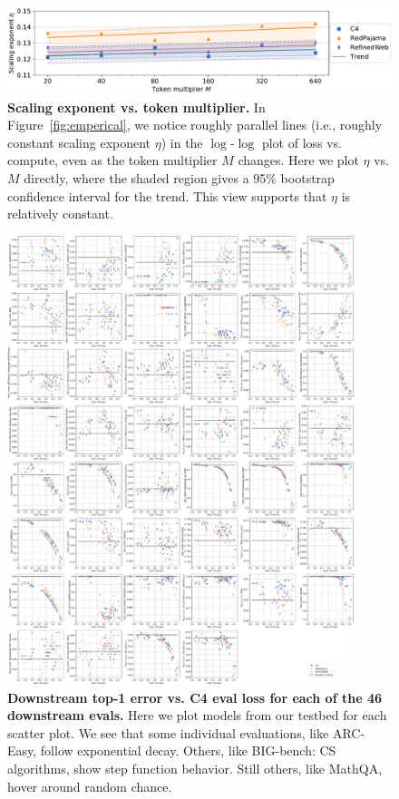 \begin{appendix}
\begin{figure}[tp]
    \centering
    \includegraphics[width=\linewidth]{figs/slopes.pdf}
    \caption{
    \textbf{Scaling exponent vs. token multiplier.} 
    In Figure~\ref{fig:emperical}, we notice roughly parallel lines (i.e., roughly constant scaling exponent $\eta$) in the $\log$-$\log$ plot of loss vs. compute, even as the token multiplier $M$ changes.
    Here we plot $\eta$ vs. $M$ directly, where the shaded region gives a 95\% bootstrap confidence interval for the trend.
    This view supports that $\eta$ is relatively constant.
    }
    \label{fig:slopes}
\end{figure}

\begin{figure}[tp]
    \centering
    \includegraphics[width=0.9\textwidth]{figs/downstream_corr_all.pdf}
    \caption{\textbf{Downstream top-1 error vs. C4 eval loss for each of the 46 downstream evals.} Here we plot models from our testbed for each scatter plot.
    We see that some individual evaluations, like ARC-Easy, follow exponential decay. Others, like BIG-bench: CS algorithms, show step function behavior. Still others, like MathQA, hover around random chance.}
    \label{fig:mega}
\end{figure}


\end{appendix}
